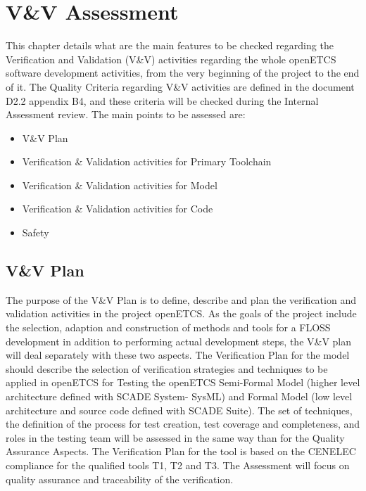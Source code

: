 \documentclass[openetcs]{template/openetcs_article}
\begin{document}
\section{V\&V Assessment}
This chapter details what are the main features to be checked regarding the Verification and Validation (V\&V) activities regarding the whole openETCS software
development activities, from the very beginning of the project to the end of it.
The Quality Criteria regarding V\&V activities are defined in the document D2.2 appendix B4, and these criteria will be checked during the Internal Assessment
review. The main points to be assessed are:
\begin{itemize}
\item V\&V Plan
\item Verification \& Validation activities for Primary Toolchain
\item Verification \& Validation activities for Model
\item Verification \& Validation activities for Code
\item Safety
\end{itemize}

\subsection{V\&V Plan}
The purpose of the V\&V Plan is to define, describe and plan the verification and validation activities in the project openETCS. As the goals of the project
include the selection, adaption and construction of methods and tools for a FLOSS development in addition to performing actual development steps, the V\&V plan
will deal separately with these two aspects.
The Verification Plan for the model should describe the selection of verification strategies and techniques to be applied in openETCS for Testing the openETCS Semi-Formal Model (higher level architecture defined with SCADE System- SysML) and Formal Model (low level architecture and source code defined with SCADE Suite). The set of techniques, the definition of the process for test creation, test coverage and completeness, and roles in
the testing team will be assessed in the same way than for the Quality Assurance Aspects.
The Verification Plan for the tool is based on the CENELEC compliance for the qualified tools T1, T2 and T3. The Assessment will focus on quality assurance and
traceability of the verification.
\end{document}
